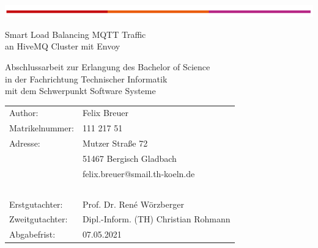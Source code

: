 \begin{titlepage}
\begin{flushleft}
	\vspace*{-1cm}
	\includegraphics[scale=1]{images/th-bar.png}\\
	\vspace*{1cm}
\end{flushleft}
\begin{center}
\begin{huge}
Smart Load Balancing MQTT Traffic\\
an HiveMQ Cluster mit Envoy\\
\end{huge}
\vspace{2cm}
Abschlussarbeit zur Erlangung des Bachelor of Science\\
in der Fachrichtung Technischer Informatik\\
mit dem Schwerpunkt Software Systeme
\end{center}
\vspace{4cm}
\noindent\begin{tabular}{p{5cm}l}
	Author: & Felix Breuer \\
	Matrikelnummer: &	111 217 51 \\
	Adresse: & Mutzer Stra{\ss}e 72 \\
	~ &	51467 Bergisch Gladbach \\
	~ &	felix.breuer@smail.th-koeln.de \\
	~ & ~ \\
	Erstgutachter: & Prof. Dr. René Wörzberger \\
	Zweitgutachter: & Dipl.-Inform. (TH) Christian Rohmann \\
	Abgabefrist: & 07.05.2021 \\
\end{tabular}
~\\
~\\
~\\
~\\
~\\
~\\
\end{titlepage}
\newpage

